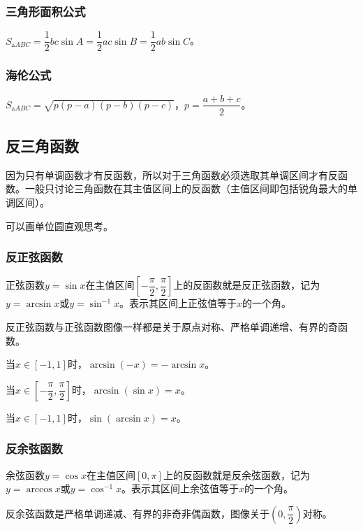 \documentclass[UTF8, 12pt]{ctexart}
\begin{document}
        \subsubsection{三角形面积公式}

        $S_{\vartriangle ABC}=\dfrac{1}{2}bc\sin A=\dfrac{1}{2}ac\sin B=\dfrac{1}{2}ab\sin C$。

        \subsubsection{海伦公式}

        $S_{\vartriangle ABC}=\sqrt{p(p-a)(p-b)(p-c)}$，$p=\dfrac{a+b+c}{2}$。

        \subsection{反三角函数}

        因为只有单调函数才有反函数，所以对于三角函数必须选取其单调区间才有反函数。一般只讨论三角函数在其主值区间上的反函数（主值区间即包括锐角最大的单调区间）。

        可以画单位圆直观思考。

        \subsubsection{反正弦函数}

        正弦函数$y=\sin x$在主值区间$\left[-\dfrac{\pi}{2},\dfrac{\pi}{2}\right]$上的反函数就是反正弦函数，记为$y=\arcsin x$或$y=\sin^{-1}x$。表示其区间上正弦值等于$x$的一个角。

        反正弦函数与正弦函数图像一样都是关于原点对称、严格单调递增、有界的奇函数。

        当$x\in[-1,1]$时，$\arcsin(-x)=-\arcsin x$。

        当$x\in\left[-\dfrac{\pi}{2},\dfrac{\pi}{2}\right]$时，$\arcsin(\sin x)=x$。

        当$x\in[-1,1]$时，$\sin(\arcsin x)=x$。

        \subsubsection{反余弦函数}

        余弦函数$y=\cos x$在主值区间$[0,\pi]$上的反函数就是反余弦函数，记为$y=\arccos x$或$y=\cos^{-1}x$。表示其区间上余弦值等于$x$的一个角。

        反余弦函数是严格单调递减、有界的非奇非偶函数，图像关于$\left(0,\dfrac{\pi}{2}\right)$对称。
\end{document}
